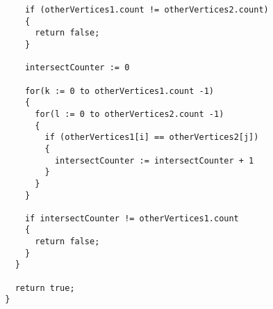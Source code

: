 \documentclass[class=article]{standalone}
\begin{document}
\begin{lstlisting}
      if (otherVertices1.count != otherVertices2.count)
      {
        return false;
      }

      intersectCounter := 0

      for(k := 0 to otherVertices1.count -1)
      {
        for(l := 0 to otherVertices2.count -1)
        {
          if (otherVertices1[i] == otherVertices2[j])
          {
            intersectCounter := intersectCounter + 1
          }
        }
      }

      if intersectCounter != otherVertices1.count
      {
        return false;
      }
    }

    return true;
  }
\end{lstlisting}
\end{document}
